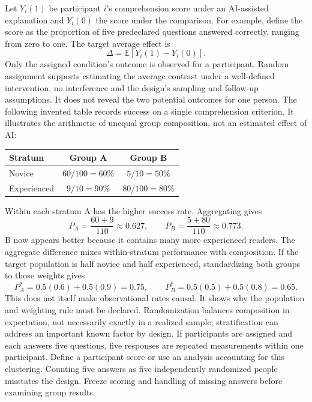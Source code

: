 Let $Y_i(1)$ be participant $i$'s comprehension score under an AI-assisted explanation and $Y_i(0)$ the score under the comparison. For example, define the score as the proportion of five predeclared questions answered correctly, ranging from zero to one. The target average effect is
\[
\Delta=\mathbb E[Y_i(1)-Y_i(0)].
\]
Only the assigned condition's outcome is observed for a participant. Random assignment supports estimating the average contrast under a well-defined intervention, no interference and the design's sampling and follow-up assumptions. It does not reveal the two potential outcomes for one person.
The following invented table records success on a single comprehension criterion. It illustrates the arithmetic of unequal group composition, not an estimated effect of AI:
\begin{center}
\begin{tabular}{lcc}
\toprule
Stratum & Group A & Group B\\\midrule
Novice & $60/100=60\%$ & $5/10=50\%$\\
Experienced & $9/10=90\%$ & $80/100=80\%$\\\bottomrule
\end{tabular}
\end{center}
Within each stratum A has the higher success rate. Aggregating gives
\[
P_A=\frac{60+9}{110}\approx0.627,\qquad
P_B=\frac{5+80}{110}\approx0.773.
\]
B now appears better because it contains many more experienced readers. The aggregate difference mixes within-stratum performance with composition.
If the target population is half novice and half experienced, standardizing both groups to those weights gives
\[
P_A^*=0.5(0.6)+0.5(0.9)=0.75,\qquad
P_B^*=0.5(0.5)+0.5(0.8)=0.65.
\]
This does not itself make observational rates causal. It shows why the population and weighting rule must be declared. Randomization balances composition in expectation, not necessarily exactly in a realized sample; stratification can address an important known factor by design.
If participants are assigned and each answers five questions, five responses are repeated measurements within one participant. Define a participant score or use an analysis accounting for this clustering. Counting five answers as five independently randomized people misstates the design. Freeze scoring and handling of missing answers before examining group results.

